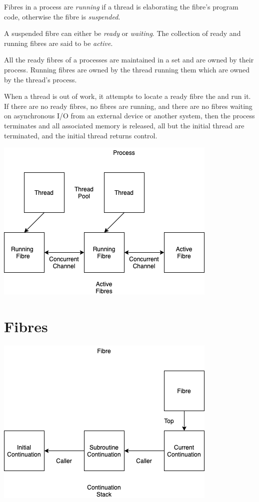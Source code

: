 \documentclass[oneside]{book}
\begin{document}
Fibres in a process are {\em running} if a thread is elaborating the
fibre's program code, otherwise the fibre is {\em suspended}. 

A suspended fibre can either be {\em ready} or {\em waiting}.
The collection of ready and running fibres are said to be {\em active}.

All the ready fibres of a processes are maintained in a set and
are owned by their process. Running fibres are owned by the thread
running them which are owned by the thread's process.

When a thread is out of work, it attempts to locate a 
ready fibre the and run it. If there are no ready fibres,
no fibres are running, and there are no fibres waiting on
asynchronous I/O from an external device or another system,
then the process terminates and all associated memory is released,
all but the initial thread are terminated, and the initial thread
returns control.

\includegraphics{../src/tex/process.png}


\section{Fibres}

\includegraphics{../src/tex/fibre.png}
\end{document}
